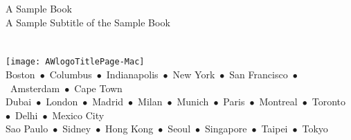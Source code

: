 \thispagestyle{empty}
\begin{center}
{\sfititle A \Cpp{} Sample Book} \\
\vspace*{54pt}
{\sfihalftitle A Sample Subtitle of the Sample Book}\\
\vspace*{\fill}    %
\\[3ex]
\\        %

\vspace*{\fill}    %
\texttt{[image: AWlogoTitlePage-Mac]}\\   %
{\footnotesize 
Boston~$\bullet$~Columbus~$\bullet$~Indianapolis~$\bullet$~New York~$\bullet$~San Francisco~$\bullet$~Amsterdam~$\bullet$~Cape Town\\[1ex]
Dubai~$\bullet$~London~$\bullet$~Madrid~$\bullet$~Milan~$\bullet$~Munich~$\bullet$~Paris~$\bullet$~Montreal~$\bullet$~Toronto~$\bullet$~Delhi~$\bullet$~Mexico City\\[1ex]
Sao Paulo~$\bullet$~Sidney~$\bullet$~Hong Kong~$\bullet$~Seoul~$\bullet$~Singapore~$\bullet$~Taipei~$\bullet$~Tokyo\\[1ex]
}
\end{center}

